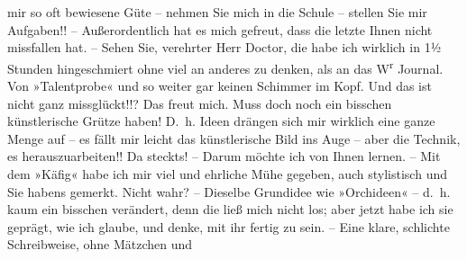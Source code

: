                mir so oft bewiesene Güte – nehmen Sie mich in die Schule – stellen Sie mir
               Aufgaben!! – Außerordentlich hat es mich gefreut, dass {\pb}die letzte \label{K_L03713-3v}\label{K_L03713-3} Ihnen nicht
               missfallen hat. – Sehen Sie, verehrter Herr Doctor, die habe ich wirklich in 1½ Stunden
               hingeschmiert ohne viel an anderes zu denken, als an das W\textsuperscript{r} Journal. Von »Talentprobe«
               und so weiter gar keinen Schimmer im Kopf. Und das ist nicht ganz missglückt!!? Das
               freut mich. Muss doch noch ein bisschen künstlerische Grütze haben! D. h. Ideen
               drängen sich mir wirklich eine ganze Menge auf – es fällt mir leicht das
               künstlerische Bild ins Auge – aber die Technik, es herauszuarbeiten!! Da steckts! –
               Darum möchte ich von Ihnen lernen. – Mit dem »Käfig« habe ich mir viel und ehrliche Mühe gegeben, auch stylistisch und Sie
               habens gemerkt. Nicht wahr? – Dieselbe Grundidee wie »Orchideen« – d. h. kaum ein bisschen verändert, denn die
               ließ mich nicht los; aber jetzt habe ich sie geprägt, wie ich glaube, und denke, mit
               ihr fertig zu sein. – Eine klare, schlichte Schreibweise, ohne Mätzchen und
